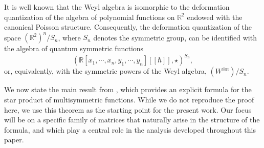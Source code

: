 \documentclass[11pt]{article}
\begin{document}
It is well known that the Weyl algebra is isomorphic to the deformation quantization of the algebra of polynomial functions on $\mathbb{R}^2$ endowed with the canonical Poisson structure. Consequently, the deformation quantization of the space $(\mathbb{R}^2)^n/S_n$, where $S_n$ denotes the symmetric group, can be identified with the algebra of quantum symmetric functions
$$(\mathbb{R}[x_1,\cdots,x_n,y_1,\cdots,y_n][[\hbar]],\star)^{S_n},$$
or, equivalently, with the symmetric powers of the Weyl algebra, $(W^{\otimes n})/S_n$.

We now state the main result from \cite{DP2}, which provides an explicit formula for the star product of multisymmetric functions. While we do not reproduce the proof here, we use this theorem as the starting point for the present work. Our focus will be on a specific family of matrices that naturally arise in the structure of the formula, and which play a central role in the analysis developed throughout this paper.
\end{document}
